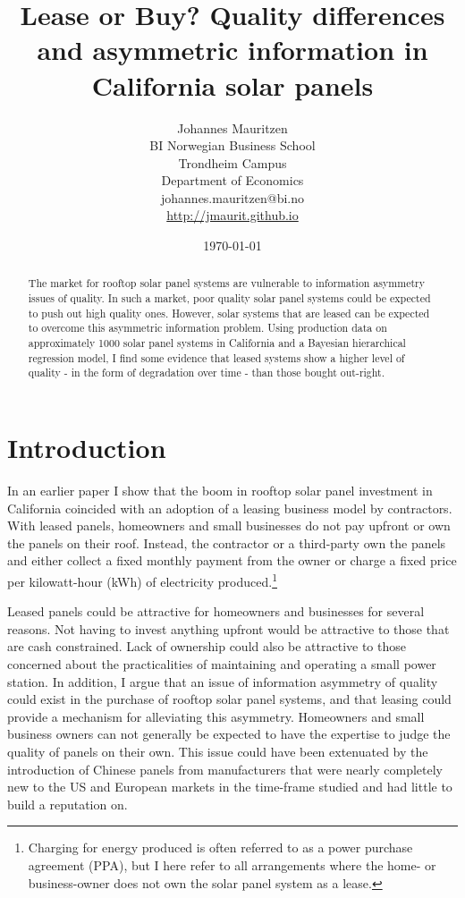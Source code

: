 \documentclass[12pt]{article}
\title{Lease or Buy? Quality differences and asymmetric information in California solar panels}
\date{\today}
\author{Johannes Mauritzen \\ BI Norwegian Business School \\ Trondheim Campus \\ Department of Economics \\ johannes.mauritzen@bi.no\\\url{http://jmaurit.github.io}}
\begin{document}
 \begin{spacing}{1} %
	\maketitle

\begin{abstract}
 The market for rooftop solar panel systems are vulnerable to information asymmetry issues of quality. In such a market, poor quality solar panel systems could be expected to push out high quality ones. However, solar systems that are leased can be expected to overcome this asymmetric information problem. Using production data on approximately 1000 solar panel systems in California and a Bayesian hierarchical regression model, I find some evidence that leased systems show a higher level of quality - in the form of degradation over time - than those bought out-right.
\end{abstract}

 \end{spacing}

\section{Introduction}
In an earlier paper \citep{mauritzen_whats_2015} I show that the boom in rooftop solar panel investment in California coincided with an adoption of a leasing business model by contractors. With leased panels, homeowners and small businesses do not pay upfront or own the panels on their roof. Instead, the contractor or a third-party own the panels and either collect a fixed monthly payment from the owner or charge a fixed price per kilowatt-hour (kWh) of electricity produced.\footnote{Charging for energy produced is often referred to as a power purchase agreement (PPA), but I here refer to all arrangements where the home- or business-owner does not own the solar panel system as a lease.}

Leased panels could be attractive for homeowners and businesses for several reasons. Not having to invest anything upfront would be attractive to those that are cash constrained. Lack of ownership could also be attractive to those concerned about the practicalities of maintaining and operating a small power station.
In addition, I argue that an issue of information asymmetry of quality could exist in the purchase of rooftop solar panel systems, and that leasing could provide a mechanism for alleviating this asymmetry. Homeowners and small business owners can not generally be expected to have the expertise to judge the quality of panels on their own. This issue could have been extenuated by the introduction of Chinese panels from manufacturers that were nearly completely new to the US and European markets in the time-frame studied and had little to build a reputation on.
\end{document}
